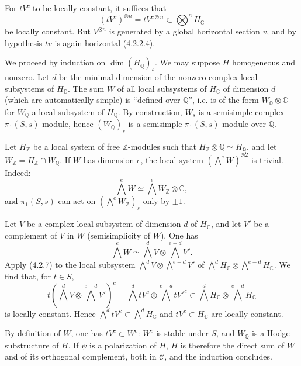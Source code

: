 \documentclass[10pt]{article}
\newcommand{\C}{\mathbb C}
\newcommand{\Q}{\mathbb Q}
\newcommand{\Z}{\mathbb Z}
\begin{document}
For $tV^c$ to be locally constant, it suffices that
\[
(tV^c)^{\otimes n}=tV^{c\otimes n}\subset\bigotimes^n H_\C
\]
be locally constant. But $V^{\otimes n}$ is generated by a global horizontal section $v$, and by hypothesis $tv$ is again horizontal (4.2.2.4).

We proceed by induction on $\dim(H_\Q)_s$. We may suppose $H$ homogeneous and nonzero. Let $d$ be the minimal dimension of the nonzero complex local subsystems of $H_\C$. The sum $W$ of all local subsystems of $H_\C$ of dimension $d$ (which are automatically simple) is ``defined over $\Q$'', i.e. is of the form $W_\Q\otimes\C$ for $W_\Q$ a local subsystem of $H_\Q$. By construction, $W_s$ is a semisimple complex $\pi_1(S,s)$-module, hence $(W_\Q)_s$ is a semisimple $\pi_1(S,s)$-module over $\Q$.

Let $H_\Z$ be a local system of free $\Z$-modules such that $H_\Z\otimes\Q\simeq H_\Q$, and let $W_\Z=H_\Z\cap W_\Q$. If $W$ has dimension $e$, the local system $(\bigwedge^eW)^{\otimes2}$ is trivial. Indeed:
\[
\bigwedge^eW\simeq \bigwedge^eW_\Z\otimes\C,
\]
and $\pi_1(S,s)$ can act on $(\bigwedge^eW_\Z)_s$ only by $\pm1$.

Let $V$ be a complex local subsystem of dimension $d$ of $H_\C$, and let $V'$ be a complement of $V$ in $W$ (semisimplicity of $W$). One has
\[
\bigwedge^eW\simeq \bigwedge^dV\otimes\bigwedge^{e-d}V'.
\]
Apply (4.2.7) to the local subsystem $\bigwedge^dV\otimes\bigwedge^{e-d}V'$ of $\bigwedge^dH_\C\otimes\bigwedge^{e-d}H_\C$. We find that, for $t\in S$,
\[
t(\bigwedge^dV\otimes\bigwedge^{e-d}V')^c=
\bigwedge^d tV^c\otimes\bigwedge^{e-d}tV'^c
\subset \bigwedge^dH_\C\otimes\bigwedge^{e-d}H_\C
\]
is locally constant. Hence $\bigwedge^d tV^c\subset\bigwedge^dH_\C$ and $tV^c\subset H_\C$ are locally constant.

By definition of $W$, one has $tV^c\subset W^c$: $W^c$ is stable under $S$, and $W_\Q$ is a Hodge substructure of $H$. If $\psi$ is a polarization of $H$, $H$ is therefore the direct sum of $W$ and of its orthogonal complement, both in $\mathcal C$, and the induction concludes.
\end{document}
